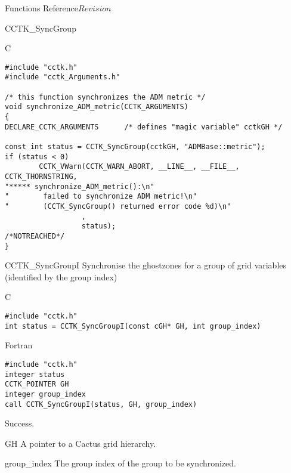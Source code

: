 \begin{cactuspart}{ Functions Reference}{}{$Revision$}
\begin{FunctionDescription}{CCTK\_SyncGroup}
\begin{ExampleSection}
\begin{Example}{C}
\begin{verbatim}
#include "cctk.h"
#include "cctk_Arguments.h"

/* this function synchronizes the ADM metric */
void synchronize_ADM_metric(CCTK_ARGUMENTS)
{
DECLARE_CCTK_ARGUMENTS      /* defines "magic variable" cctkGH */

const int status = CCTK_SyncGroup(cctkGH, "ADMBase::metric");
if (status < 0)
        CCTK_VWarn(CCTK_WARN_ABORT, __LINE__, __FILE__, CCTK_THORNSTRING,
"***** synchronize_ADM_metric():\n"
"        failed to synchronize ADM metric!\n"
"        (CCTK_SyncGroup() returned error code %d)\n"
                  ,
                  status);                                 /*NOTREACHED*/
}
\end{verbatim}
\end{Example}
\end{ExampleSection}
\end{FunctionDescription}



\begin{FunctionDescription}{CCTK\_SyncGroupI}
\label{CCTK-SyncGroupI}
Synchronise the ghostzones for a group of grid variables
(identified by the group index)

\begin{SynopsisSection}
\begin{Synopsis}{C}
\begin{verbatim}
#include "cctk.h"
int status = CCTK_SyncGroupI(const cGH* GH, int group_index)
\end{verbatim}
\end{Synopsis}
\begin{Synopsis}{Fortran}
\begin{verbatim}
#include "cctk.h"
integer status
CCTK_POINTER GH
integer group_index
call CCTK_SyncGroupI(status, GH, group_index)
\end{verbatim}
\end{Synopsis}
\end{SynopsisSection}

\begin{ResultSection}
\begin{Result}{0}
Success.
\end{Result}
\end{ResultSection}

\begin{ParameterSection}
\begin{Parameter}{GH}
A pointer to a Cactus grid hierarchy.
\end{Parameter}
\begin{Parameter}{group\_index}
The group index of the group to be synchronized.
\end{Parameter}
\end{ParameterSection}


\end{FunctionDescription}
\end{cactuspart}
